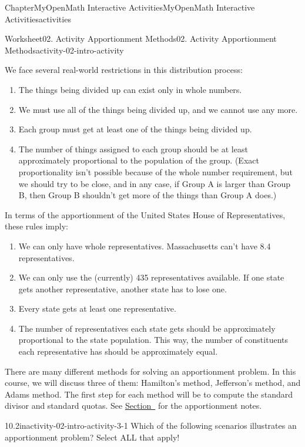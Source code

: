 \documentclass[oneside,10pt,]{book}
\begin{document}
\begin{chapterptx}{Chapter}{MyOpenMath Interactive Activities}{}{MyOpenMath Interactive Activities}{}{}{activities}
\begin{worksheet-section}{Worksheet}{02. Activity Apportionment Methods}{}{02. Activity Apportionment Methods}{}{}{activity-02-intro-activity}
 \par
We face several real-world restrictions in this distribution process:%
\begin{enumerate}[label={\arabic*}]
\item{}The things being divided up can exist only in whole numbers.%
\item{}We must use all of the things being divided up, and we cannot use any more.%
\item{}Each group must get at least one of the things being divided up.%
\item{}The number of things assigned to each group should be at least approximately proportional to the population of the group. (Exact proportionality isn't possible because of the whole number requirement, but we should try to be close, and in any case, if Group A is larger than Group B, then Group B shouldn't get more of the things than Group A does.)%
\end{enumerate}
 In terms of the apportionment of the United States House of Representatives, these rules imply:%
 \par
%
\begin{enumerate}[label={\arabic*}]
\item{}We can only have whole representatives. Massachusetts can't have 8.4 representatives.%
\item{}We can only use the (currently) 435 representatives available. If one state gets another representative, another state has to lose one.%
\item{}Every state gets at least one representative.%
\item{}The number of representatives each state gets should be approximately proportional to the state population. This way, the number of constituents each representative has should be approximately equal.%
\end{enumerate}
%
 \par
There are many different methods for solving an apportionment problem. In this course, we will discuss three of them: Hamilton's method, Jefferson's method, and Adams method. The first step for each method will be to compute the standard divisor and standard quotas.%
See \hyperref[section-apportionment]{Section~} for the apportionment notes.%
\clearpage
\begin{divisionexercise}{1}{}{0.2in}{activity-02-intro-activity-3-1}%
Which of the following scenarios illustrates an apportionment problem? Select ALL that apply!%
\par
%
\begin{enumerate}[label={(\alph*)}]

\end{enumerate}
\end{divisionexercise}
\end{worksheet-section}
\end{chapterptx}
\end{document}
